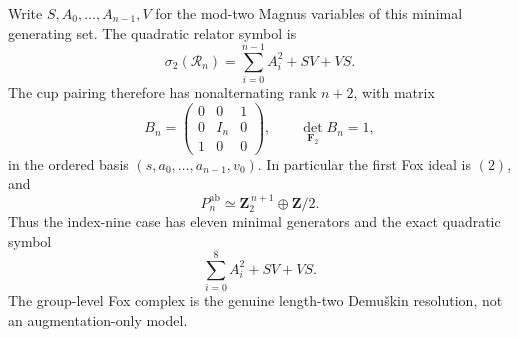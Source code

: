 \begin{theorem}
Write $S,A_0,\ldots,A_{n-1},V$
for the mod-two Magnus variables
of this minimal generating set.
The quadratic relator symbol is
\begin{equation}\label{eq:dyadic-f135-uniform-magnus-quadratic}
\boxed{\quad
\sigma_2(\mathscr R_n)
=\sum_{i=0}^{n-1}A_i^2+SV+VS.
\quad}
\end{equation}
The cup pairing therefore has
nonalternating rank $n+2$,
with matrix
\begin{equation}\label{eq:dyadic-f135-tower-cup-matrix}
\boxed{\qquad
B_n=
\begin{pmatrix}
0&0&1\\
0&I_n&0\\
1&0&0
\end{pmatrix},
\qquad
\det_{\mathbf F_2} B_n=1,
\qquad}
\end{equation}
in the ordered basis
$(s,a_0,\ldots,a_{n-1},v_0)$.
In particular the first Fox
ideal is $(2)$, and
\begin{equation}\label{eq:dyadic-f135-uniform-abelianization}
P_n^{\mathrm{ab}}
\simeq\mathbf Z_2^{\,n+1}
\oplus\mathbf Z/2.
\end{equation}
Thus the index-nine case
has eleven minimal generators
and the exact quadratic symbol
\[
\sum_{i=0}^{8}A_i^2+SV+VS.
\]
The group-level Fox complex is
the genuine length-two
Demu\v{s}kin resolution, not
an augmentation-only model.
\end{theorem}

